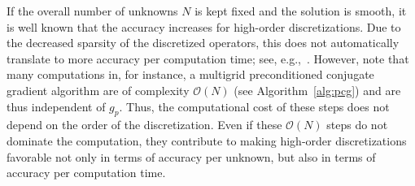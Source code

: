 \documentclass[smallcondensed,final]{svjour3}     %
\begin{document}


%
%


If the overall number of unknowns $N$ is kept fixed and the
solution is smooth, it is well known that the accuracy increases for
high-order discretizations. Due to the decreased sparsity of the
discretized operators, this does not automatically translate to more
accuracy per computation time; see, e.g.,~\cite{Brown10}. However, note
that many computations in, for instance, a multigrid
preconditioned conjugate gradient algorithm are of complexity
$\mathcal{O}(N)$ (see Algorithm~\ref{alg:pcg}) and are thus independent of
$g_p$. Thus, the computational cost of these steps does not depend on
the order of the discretization. Even if these $\mathcal{O}(N)$ steps
do not dominate the computation, they contribute to making high-order
discretizations favorable not only in terms of accuracy per unknown,
but also in terms of accuracy per computation time.
\end{document}
